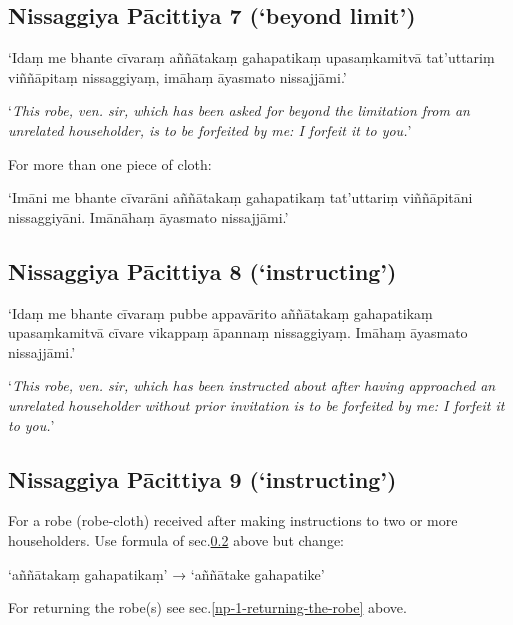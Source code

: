 \subsection{Nissaggiya Pācittiya 7 (‘beyond limit’)}

‘Idaṃ me bhante cīvaraṃ aññātakaṃ gahapatikaṃ upasaṃkamitvā tat'uttariṃ
viññāpitaṃ nissaggiyaṃ, imāhaṃ āyasmato nissajjāmi.’

‘\emph{This robe, ven. sir, which has been asked for beyond the limitation from
  an unrelated householder, is to be forfeited by me: I forfeit it to you.}’

For more than one piece of cloth:

‘Imāni me bhante cīvarāni aññātakaṃ gahapatikaṃ tat'uttariṃ viññāpitāni
nissaggiyāni. Imānāhaṃ āyasmato nissajjāmi.’


\subsection{Nissaggiya Pācittiya 8 (‘instructing’)}
\label{np-8-instructing}

‘Idaṃ me bhante cīvaraṃ pubbe appavārito aññātakaṃ gahapatikaṃ upasaṃkamitvā
cīvare vikappaṃ āpannaṃ nissaggiyaṃ. Imāhaṃ āyasmato nissajjāmi.’

‘\emph{This robe, ven. sir, which has been instructed about after having
  approached an unrelated householder without prior invitation is to be
  forfeited by me: I forfeit it to you.}’ 


\subsection{Nissaggiya Pācittiya 9 (‘instructing’)}

For a robe (robe-cloth) received after making instructions to two or more
householders. Use formula of sec.\ref{np-8-instructing} above but change:

‘aññātakaṃ gahapatikaṃ’ → ‘aññātake gahapatike’

For returning the robe(s) see sec.\ref{np-1-returning-the-robe} above.

